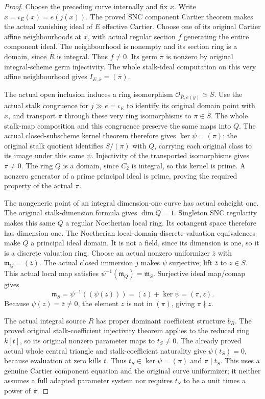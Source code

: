 \begin{proof}
Choose the preceding curve internally and fix $x$. Write
$\overline x=\iota_E(x)=e(j(x))$. The proved SNC component Cartier
theorem makes the actual vanishing ideal of $E$ effective Cartier.
Choose one of its original Cartier affine neighbourhoods at
$\overline x$, with actual regular section $f$ generating the
entire component ideal. The neighbourhood is nonempty and its
section ring is a domain, since $\overline R$ is integral.
Thus $f\ne0$. Its germ $\overline\pi$ is nonzero by original
integral-scheme germ injectivity. The whole stalk-ideal computation
on this very affine neighbourhood gives
$I_{E,\overline x}=(\overline\pi)$.

The actual open inclusion induces a ring isomorphism
$\mathcal O_{\overline R,e(y)}\simeq S$. Use the actual stalk
congruence for $j\gg e=\iota_E$ to identify its original domain
point with $\overline x$, and transport $\overline\pi$ through
these very ring isomorphisms to $\pi\in S$. The whole stalk-map
composition and this congruence preserve the same maps into $Q$.
The actual closed-subscheme kernel theorem therefore gives
$\ker\psi=(\pi)$; the original stalk quotient identifies
$S/(\pi)$ with $Q$, carrying each original class to its image
under this same $\psi$. Injectivity of the transported isomorphisms
gives $\pi\ne0$. The ring $Q$ is a domain, since $C_2$ is integral,
so this kernel is prime. A nonzero generator of a prime principal
ideal is prime, proving the required property of the actual $\pi$.

The nongeneric point of an integral dimension-one curve has actual
coheight one. The original stalk-dimension formula gives
$\dim Q=1$. Singleton SNC regularity makes this same $Q$ a regular
Noetherian local ring. Its cotangent space therefore has dimension
one. The Noetherian local-domain discrete-valuation equivalences
make $Q$ a principal ideal domain. It is not a field, since its
dimension is one, so it is a discrete valuation ring. Choose an
actual nonzero uniformizer $\overline z$ with
$\mathfrak m_Q=(\overline z)$.
The actual closed immersion $j$ makes $\psi$ surjective; lift
$\overline z$ to $z\in S$. This actual local map satisfies
$\psi^{-1}(\mathfrak m_Q)=\mathfrak m_S$. Surjective ideal
map/comap gives
\[
 \mathfrak m_S=\psi^{-1}((\psi(z)))=(z)+\ker\psi=(\pi,z).
\]
Because $\psi(z)=\overline z\ne0$, the element $z$ is not in
$(\pi)$, giving $\pi\nmid z$.

The actual integral source $R$ has proper dominant coefficient
structure $b_R$. The proved original stalk-coefficient injectivity
theorem applies to the reduced ring $k[t]$, so its original nonzero
parameter maps to $t_S\ne0$. The already proved actual whole
central triangle and stalk-coefficient naturality give
$\psi(t_S)=0$, because evaluation at zero kills $t$.
Thus $t_S\in\ker\psi=(\pi)$ and $\pi\mid t_S$.
This uses a genuine Cartier component equation and the original
curve uniformizer; it neither assumes a full adapted parameter
system nor requires $t_S$ to be a unit times a power of $\pi$.
\end{proof}
